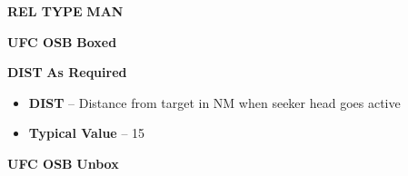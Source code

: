 \documentclass[fontInter]{TechCheck}
\begin{document}
\begin{tableitemize}
{\begin{subenumerate}
			\item \textbf{REL TYPE} \dotfill \textbf{MAN}
			\item \textbf{UFC OSB} \dotfill \textbf{Boxed}
			\item \textbf{DIST} \dotfill \textbf{As Required}
			\begin{itemize}
				\item \textbf{DIST} -- Distance from target in NM when seeker head goes active
				\item \textbf{Typical Value} -- 15
			\end{itemize}
			\item \textbf{UFC OSB} \dotfill \textbf{Unbox}
		\end{subenumerate}}
	\end{tableitemize}

	\clearpage
\end{document}

